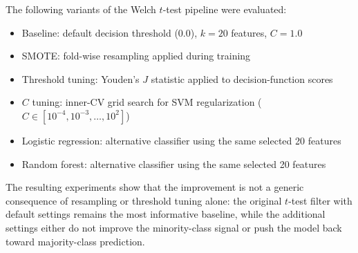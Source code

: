 The following variants of the Welch $t$-test pipeline were evaluated:
\begin{itemize}
    \item Baseline: default decision threshold (0.0), $k = 20$ features, $C = 1.0$
    \item SMOTE: fold-wise resampling applied during training
    \item Threshold tuning: Youden's $J$ statistic applied to decision-function scores
    \item $C$ tuning: inner-CV grid search for SVM regularization ($C \in [10^{-4}, 10^{-3}, \ldots, 10^{2}]$)
    \item Logistic regression: alternative classifier using the same selected 20 features
    \item Random forest: alternative classifier using the same selected 20 features
\end{itemize}

The resulting experiments show that the improvement is not a generic consequence of resampling or threshold tuning alone: the original $t$-test filter with default settings remains the most informative baseline, while the additional settings either do not improve the minority-class signal or push the model back toward majority-class prediction.

